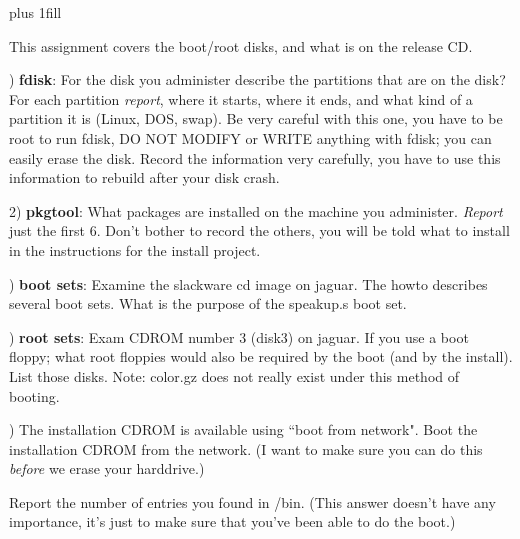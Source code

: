 
\rightskip=0pt plus 1fill

\parindent 0pt

This assignment covers the boot/root disks, and what is on the release CD.

) {\bf fdisk}:
For the disk you administer describe the partitions that are on the disk?
For each partition {\it report}, where it starts, where it ends, and what kind
of a partition it is (Linux, DOS, swap).
Be very careful with this one, you have to be root to run fdisk,
DO NOT MODIFY or WRITE anything with fdisk; 
you can easily erase the disk.
Record the information very carefully, you have to use this information
to rebuild after your disk crash.

2) {\bf pkgtool}:
What packages are installed on the machine you administer.
{\it Report} just the first 6. Don't bother to record the others, you will
be told what to install in the instructions for the install project.

) {\bf boot sets}:
Examine the slackware cd image on {\ltt{}jaguar}.
The howto describes several boot sets.
What is the purpose of the {\ltt{}speakup.s} boot set.

) {\bf root sets}:
Exam CDROM number 3 (disk3) on {\ltt{}jaguar}.
If you use a boot floppy;
what root floppies would also be required by the boot (and
by the install).
List those disks. Note: {\ltt{}color.gz} does not really
exist under this method of booting.

) The installation CDROM is available using ``boot from network".
Boot the installation CDROM from the network. (I want to make sure
you can do this {\it before} we erase your harddrive.)

Report the number of entries you found in {\ltt{}/bin}.
(This answer doesn't have any importance, it's just to make sure
that you've been able to do the boot.)

\bye
